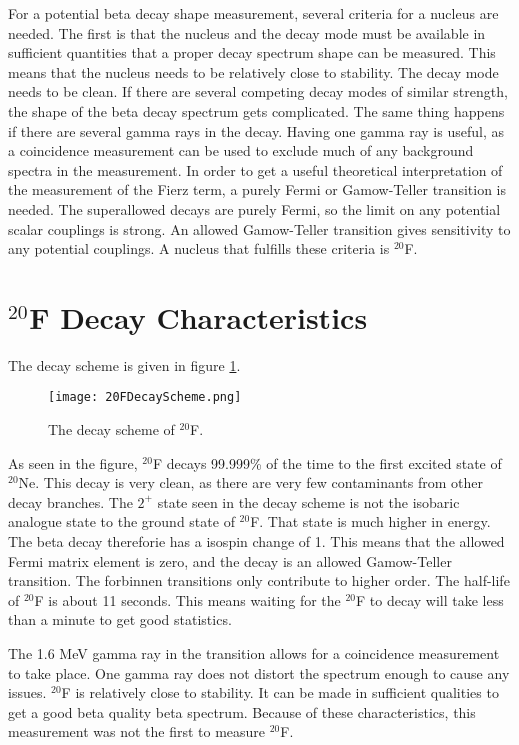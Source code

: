 \documentclass[main.tex]{subfiles}
\begin{document}
For a potential beta decay shape measurement, several criteria for a nucleus are needed.
The first is that the nucleus and the decay mode must be available in sufficient quantities that a proper decay spectrum shape can be measured.
This means that the nucleus needs to be relatively close to stability.
The decay mode needs to be clean.
If there are several competing decay modes of similar strength, the shape of the beta decay spectrum gets complicated.
The same thing happens if there are several gamma rays in the decay. 
Having one gamma ray is useful, as a coincidence measurement can be used to exclude much of any background spectra in the measurement.
In order to get a useful theoretical interpretation of the measurement of the Fierz term, a purely Fermi or Gamow-Teller transition is needed.
The superallowed decays are purely Fermi, so the limit on any potential scalar couplings is strong.
An allowed Gamow-Teller transition gives sensitivity to any potential couplings. 
A nucleus that fulfills these criteria is $^{20}$F. 
 
\section{$^{20}$F Decay Characteristics}
The decay scheme is given in figure \ref{fig:DecayScheme}.

\begin{figure}[!htb]
	\centerline{\texttt{[image: 20FDecayScheme.png]}}
	\caption{The decay scheme of $^{20}$F.}
	\label{fig:DecayScheme}
\end{figure}

As seen in the figure, $^{20}$F decays 99.999\% of the time to the first excited state of $^{20}$Ne.
This decay is very clean, as there are very few contaminants from other decay branches. 
The $2^{+}$ state seen in the decay scheme is not the isobaric analogue state to the ground state of $^{20}$F.
That state is much higher in energy.
The beta decay thereforie has a isospin change of 1.
This means that the allowed Fermi matrix element is zero, and the decay is an allowed Gamow-Teller transition. 
The forbinnen transitions only contribute to higher order.
The half-life of $^{20}$F is about 11 seconds. 
This means waiting for the $^{20}$F to decay will take less than a minute to get good statistics.

The 1.6 MeV gamma ray in the transition allows for a coincidence measurement to take place.
One gamma ray does not distort the spectrum enough to cause any issues.
$^{20}$F is relatively close to stability. 
It can be made in sufficient qualities to get a good beta quality beta spectrum.
Because of these characteristics, this measurement was not the first to measure $^{20}$F.
\end{document}
